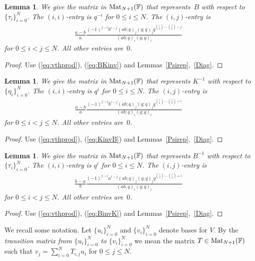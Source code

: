 \documentclass[pdftex]{sigma}
\numberwithin{equation}{section}
\newtheorem{Lemma}[Theorem]{Lemma}
\begin{document}
\begin{Lemma}\label{Btauj}
We give the matrix in ${\rm Mat}_{N+1}(\mathbb F)$ that represents~$B$ with respect to
$\lbrace \tau_i \rbrace_{i=0}^N$. The $(i,i)$-entry is $q^{-i}$ for $0 \leq i \leq N$.
The $(i,j)$-entry is
\begin{align*}
\frac{a-b}{a}
\frac{(-1)^{j-i} b^{i-j} (ab;q)_j (q;q)_j q^{\binom{i}{2}-\binom{j}{2}-j}
}{(ab;q)_i (q;q)_i}
\end{align*}
for $0 \leq i< j\leq N$. All other entries are~$0$.
\end{Lemma}
\begin{proof} Use (\ref{eq:vthprod}), (\ref{eq:BKinv}) and Lemmas~\ref{Psirep},~\ref{Diag}.
\end{proof}

\begin{Lemma}\label{Kietaj}
We give the matrix in
${\rm Mat}_{N+1}(\mathbb F)$ that represents $K^{-1}$ with respect to
$\lbrace \eta_i \rbrace_{i=0}^N$.
The $(i,i)$-entry is $q^{i}$ for $0 \leq i \leq N$.
The $(i,j)$-entry is
\begin{gather*}
\frac{a-b}{a}
\frac{(-1)^{j-i} b^{i-j} (ab;q)_j (q;q)_j q^{\binom{i}{2}-\binom{j}{2}+i}
}{
(ab;q)_i (q;q)_i}
\end{gather*}
for $0 \leq i< j\leq N$.
All other entries are~$0$.
\end{Lemma}
\begin{proof} Use (\ref{eq:vthprod}), (\ref{eq:KinvB}) and Lemmas~\ref{Psirep},~\ref{Diag}.
\end{proof}

\begin{Lemma}\label{Bitauj}
We give the matrix in
${\rm Mat}_{N+1}(\mathbb F)$ that represents $B^{-1}$ with respect to
$\lbrace \tau_i \rbrace_{i=0}^N$.
The $(i,i)$-entry is $q^{i}$ for $0 \leq i \leq N$.
The $(i,j)$-entry is
\begin{gather*}
\frac{b-a}{b}
\frac{(-1)^{j-i} a^{i-j} (ab;q)_j (q;q)_j q^{\binom{i}{2}-\binom{j}{2}+i}
}{(ab;q)_i (q;q)_i}
\end{gather*}
for $0 \leq i< j\leq N$.
All other entries are~$0$.
\end{Lemma}
\begin{proof} Use (\ref{eq:vthprod}),
(\ref{eq:BinvK}) and Lemmas~\ref{Psirep},~\ref{Diag}.
\end{proof}

We recall some notation. Let $\lbrace u_i\rbrace_{i=0}^N$
and $\lbrace v_i\rbrace_{i=0}^N$ denote bases for $V$.
By the {\it transition matrix from
 $\lbrace u_i\rbrace_{i=0}^N$
 to $\lbrace v_i\rbrace_{i=0}^N$} we mean the matrix
$T \in {\rm Mat}_{N+1}(\mathbb F)$ such that
$v_j = \sum_{i=0}^N T_{i,j} u_i$ for $0 \leq j \leq N$.
\end{document}
